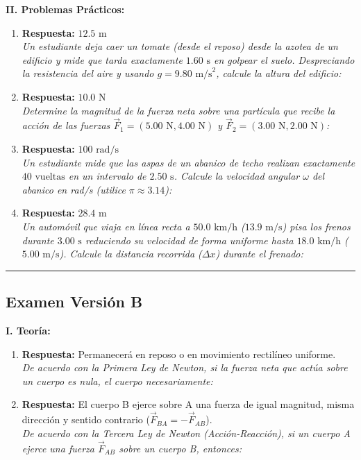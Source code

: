 \documentclass[11pt,a4paper]{article}
\begin{document}
\begin{enumerate}
\end{enumerate}\textbf{II. Problemas Prácticos:}\begin{enumerate}    \item \textbf{Respuesta:} $12.5 \text{ m}$ \\ \textit{Un estudiante deja caer un tomate (desde el reposo) desde la azotea de un edificio y mide que tarda exactamente $1.60 \text{ s}$ en golpear el suelo. Despreciando la resistencia del aire y usando $g = 9.80 \text{ m/s}^2$, calcule la altura del edificio:}
    \item \textbf{Respuesta:} $10.0 \text{ N}$ \\ \textit{Determine la magnitud de la fuerza neta sobre una partícula que recibe la acción de las fuerzas $\vec{F}_1 = (5.00 \text{ N}, 4.00 \text{ N})$ y $\vec{F}_2 = (3.00 \text{ N}, 2.00 \text{ N})$:}
    \item \textbf{Respuesta:} $100 \text{ rad/s}$ \\ \textit{Un estudiante mide que las aspas de un abanico de techo realizan exactamente $40 \text{ vueltas}$ en un intervalo de $2.50 \text{ s}$. Calcule la velocidad angular $\omega$ del abanico en rad/s (utilice $\pi \approx 3.14$):}
    \item \textbf{Respuesta:} $28.4 \text{ m}$ \\ \textit{Un automóvil que viaja en línea recta a $50.0 \text{ km/h}$ ($13.9 \text{ m/s}$) pisa los frenos durante $3.00 \text{ s}$ reduciendo su velocidad de forma uniforme hasta $18.0 \text{ km/h}$ ($5.00 \text{ m/s}$). Calcule la distancia recorrida ($\Delta x$) durante el frenado:}
\end{enumerate}\vspace{0.4cm} \hrule \vspace{0.4cm}\subsection*{Examen Versión B}\textbf{I. Teoría:}\begin{enumerate}    \item \textbf{Respuesta:} Permanecerá en reposo o en movimiento rectilíneo uniforme. \\ \textit{De acuerdo con la Primera Ley de Newton, si la fuerza neta que actúa sobre un cuerpo es nula, el cuerpo necesariamente:}
    \item \textbf{Respuesta:} El cuerpo B ejerce sobre A una fuerza de igual magnitud, misma dirección y sentido contrario ($\vec{F}_{BA} = -\vec{F}_{AB}$). \\ \textit{De acuerdo con la Tercera Ley de Newton (Acción-Reacción), si un cuerpo A ejerce una fuerza $\vec{F}_{AB}$ sobre un cuerpo B, entonces:}

\end{enumerate}
\end{document}
